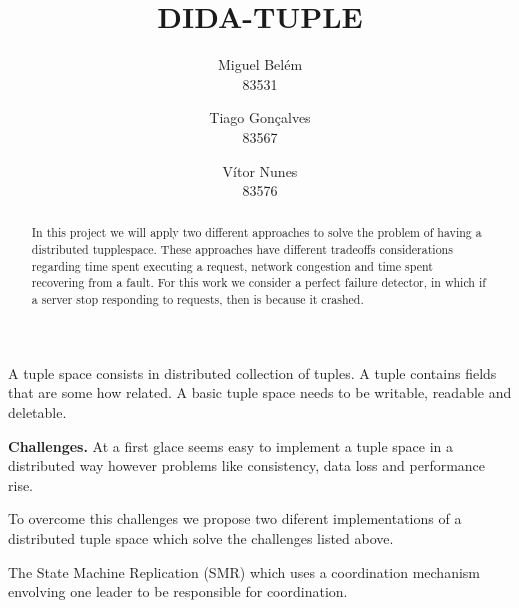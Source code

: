 \documentclass[times, 10pt,twocolumn]{article}
\begin{document}
\title{DIDA-TUPLE}

\author{Miguel Belém\\
83531\\
\and
Tiago Gonçalves\\
83567\\
\and
Vítor Nunes\\
83576\\
}

\maketitle
\thispagestyle{empty}

\begin{abstract}
   In this project we will apply two different approaches to solve the problem of
   having a distributed tupplespace. 
   These approaches have different tradeoffs considerations regarding time spent 
   executing a request, network congestion and time spent recovering from a fault.
   For this work we consider a perfect failure detector, in which if a server stop
   responding to requests, then is because it crashed.   
\end{abstract}




A tuple space consists in distributed collection of tuples. A tuple contains
fields that are some how related.
A basic tuple space needs to be writable, readable and deletable.

\textbf{Challenges.} At a first glace seems easy to implement a tuple space
in a distributed way however problems like consistency, data loss and 
performance rise.

To overcome this challenges we propose two diferent implementations of a 
distributed tuple space which solve the challenges listed above.

The State Machine Replication (SMR) which uses a coordination mechanism envolving
one leader to be responsible for coordination.
\end{document}
